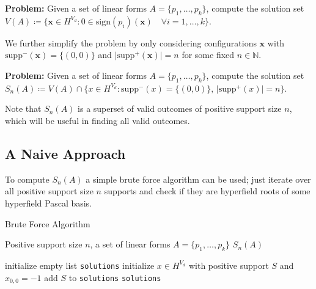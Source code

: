 \vspace{0.3cm}

\textbf{Problem:} Given a set of linear forms $A = \{ p_{1}, \dots, p_{k} \}$, compute the solution set $V(A) \coloneqq \{ \mathbf{x} \in H^{V_{d}} : 0 \in \mathrm{sign}(p_{i})(\mathbf{x})  \quad \forall i = 1, \dots, k \}$.

\vspace{0.3cm}

We further simplify the problem by only considering configurations $\mathbf{x}$ with $\mathrm{supp}^-(\mathbf{x}) = \{ (0,0) \}$ and $\vert \mathrm{supp}^+(\mathbf{x}) \vert = n$ for some fixed $n \in \mathbb N$.

\vspace{0.3cm}

\noindent \textbf{Problem:} Given a set of linear forms $A = \{ p_{1}, \dots, p_{k} \}$, compute the solution set $S_{n}(A) \coloneqq V(A) \cap \{ x \in H^{V_{d}} : \text{$\mathrm{supp}^-(x) = \{ (0,0) \}$, $\vert \mathrm{supp}^+(x) \vert = n$} \}$.

\vspace{0.3cm}

Note that $S_{n}(A)$ is a superset of valid outcomes of positive support size $n$, which will be useful in finding all valid outcomes.

\subsection*{A Naive Approach}

To compute $S_{n}(A)$ a simple brute force algorithm can be used; just iterate over all positive support size $n$ supports and check if they are hyperfield roots of some hyperfield Pascal basis.


\begin{algorithm}
\caption{Brute Force Algorithm}\label{alg:hyperfield_criterion:brute_force}
    \begin{algorithmic}[1]
    \Require Positive support size $n$, a set of linear forms $A = \{ p_{1}, \dots, p_{k} \}$
    \Ensure $S_{n}(A)$

    \State initialize empty list \texttt{solutions}
        \State initialize $x \in H^{V_{d}}$ with positive support $S$ and $x_{0,0} = -1$ 
        \State add $S$ to \texttt{solutions}
        \EndIf
    \EndFor
    \State \Return \texttt{solutions}
    \EndFunction
    \end{algorithmic}  
\end{algorithm}
    
